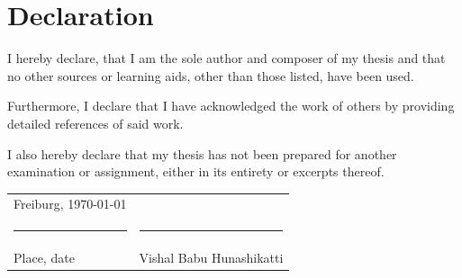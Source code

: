 \begingroup
\setlength{\parindent}{0pt}

\section*{Declaration}

\bigskip
\bigskip
\bigskip

I hereby declare, that I am the sole author and composer of my thesis and
that no other sources or learning aids, other than those listed, have been used.

Furthermore, I declare that I have acknowledged the work of others
by providing detailed references of said work.

I also hereby declare that my thesis has not been prepared
for another examination or assignment, either in its entirety or excerpts thereof.

\bigskip
\bigskip
\bigskip
\bigskip
\bigskip
\bigskip

\begin{tabular}{p{} l}
    Freiburg, \today             &                              \\
    \rule{\textwidth*2/5}{0.4pt} & \rule{\textwidth*2/5}{0.4pt} \\
    Place, date                  & Vishal Babu Hunashikatti
\end{tabular}

\endgroup
